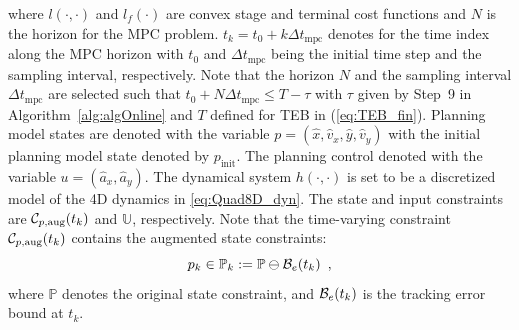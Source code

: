 %
where $l(\cdot,\cdot)$ and $l_f(\cdot)$ are convex stage and terminal cost functions and $N$ is the horizon for the MPC problem. 
$t_k = t_0 + k \Delta t_{\text{mpc}}$ denotes for the time index along the MPC horizon with $t_0$ and $\Delta t_{\text{mpc}}$ being the initial time step and the sampling interval, respectively. 
Note that the horizon $N$ and the sampling interval $\Delta t_{\text{mpc}}$ are selected such that $t_0 + N \Delta t_{\text{mpc}}\leq T - \tau$ with $\tau$ given by Step~9 in Algorithm~\ref{alg:algOnline} and $T$ defined for TEB in (\ref{eq:TEB_fin}). 
Planning model states are denoted with the variable $p = (\hat x, \hat v_x, \hat y, \hat v_y)$ with the initial planning model state denoted by $p_{\text{init}}$.
The planning control denoted with the variable $u = (\hat a_x, \hat a_y)$.
The dynamical system $h(\cdot,\cdot)$ is set to be a discretized model of the 4D dynamics in \eqref{eq:Quad8D_dyn}. The state and input constraints are $\mathcal C_{p,\text{aug}}(t_k)$ and $\mathbb{U}$, respectively. Note that the time-varying constraint $\mathcal C_{p,\text{aug}}(t_k)$ contains the augmented state constraints:
%
\begin{equation}
p_k \in \mathbb{P}_k :=\mathbb{P}\ominus\mathcal B_e(t_k) \enspace ,
\end{equation}
%
where $\mathbb{P}$ denotes the original state constraint, and $\mathcal B_e(t_k)$ is the tracking error bound at $t_k$.%


